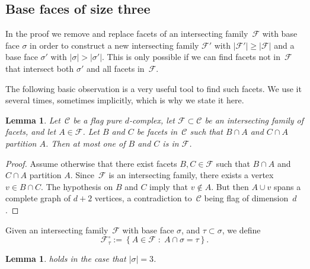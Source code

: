 \documentclass[a4paper,12pt]{amsart}
\theoremstyle{plain}
\newtheorem{lemma}[theorem]{Lemma}
\theoremstyle{definition}
\newcommand{\C}{\mathcal C}
\newcommand{\family}{\mathcal F}
\newcommand{\facetA}{A}
\newcommand{\facetB}{B}
\newcommand{\facetC}{C}
\newcommand{\face}{\sigma}
\newcommand{\smallface}{\tau}
\newcommand{\set}[2]{\left\{ #1 \; : \; #2 \right\}}
\begin{document}
\subsection{Base faces of size three}
\label{ssec:3to2}

In the proof we remove and replace facets of an intersecting family~$\family$ with base face $\face$ in order to construct a new intersecting family $\family'$ with $|\family'| \geq |\family|$ and a base face $\face'$ with $|\face| > |\face'|$.
This is only possible if we can find facets not in~$\family$ that intersect both $\face'$ and all facets in~$\family$.

The following basic observation is a very useful tool to find such facets.
We use it several times, sometimes implicitly, which is why we state it here.

\begin{lemma}
  \label{lem:opp}
  Let~$\C$ be a flag pure $d$-complex, let $\family \subset \C$ be an intersecting family of facets, and let $\facetA \in \family$. Let $\facetB$ and $\facetC$ be facets in~$\C$ such that $\facetB\cap\facetA$ and  $\facetC\cap\facetA$ partition $\facetA$. Then at most one of $\facetB$ and $\facetC$ is in $\family$.
\end{lemma}

\begin{proof}
  Assume otherwise that there exist facets $\facetB, \facetC\in \family$ such that $\facetB\cap\facetA$ and  $\facetC\cap\facetA$ partition $\facetA$.
  Since~$\family$ is an intersecting family, there exists a vertex $v \in \facetB\cap\facetC$. The hypothesis on $\facetB$ and $\facetC$ imply that $v\notin\facetA$.
  But then $\facetA \cup v$ spans a complete graph of $d+2$ vertices, a contradiction to~$\C$ being flag of dimension~$d$.
\end{proof}

Given an intersecting family~$\family$ with base face $\face$, and $\smallface \subset \face$, we define 
\[
\family_\smallface^\circ := \set{\facetA \in \family }{ \facetA\cap \face = \smallface}.
\]

\begin{lemma}
\label{lemma:3to2}
   holds in the case that $|\face| = 3$.
\end{lemma}
\end{document}
